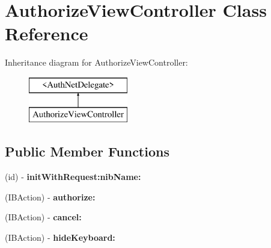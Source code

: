 \hypertarget{interface_authorize_view_controller}{
\section{AuthorizeViewController Class Reference}
\label{interface_authorize_view_controller}
}
Inheritance diagram for AuthorizeViewController:\begin{figure}[H]
\begin{center}
\leavevmode
\includegraphics[height=2.000000cm]{interface_authorize_view_controller}
\end{center}
\end{figure}
\subsection*{Public Member Functions}
\begin{DoxyCompactItemize}
\item 
\hypertarget{interface_authorize_view_controller_a76deca416aa4f62760ce24cbdd721ee9}{
(id) -\/ {\bfseries initWithRequest:nibName:}}
\label{interface_authorize_view_controller_a76deca416aa4f62760ce24cbdd721ee9}

\item 
\hypertarget{interface_authorize_view_controller_a09e858236cbf35b3ca813ff81362a5b9}{
(IBAction) -\/ {\bfseries authorize:}}
\label{interface_authorize_view_controller_a09e858236cbf35b3ca813ff81362a5b9}

\item 
\hypertarget{interface_authorize_view_controller_a491ec7561ef05a80f4921c87496aeb21}{
(IBAction) -\/ {\bfseries cancel:}}
\label{interface_authorize_view_controller_a491ec7561ef05a80f4921c87496aeb21}

\item 
\hypertarget{interface_authorize_view_controller_ab356426cdb71bec5fc9a92592aafcfd2}{
(IBAction) -\/ {\bfseries hideKeyboard:}}
\label{interface_authorize_view_controller_ab356426cdb71bec5fc9a92592aafcfd2}

\end{DoxyCompactItemize}
